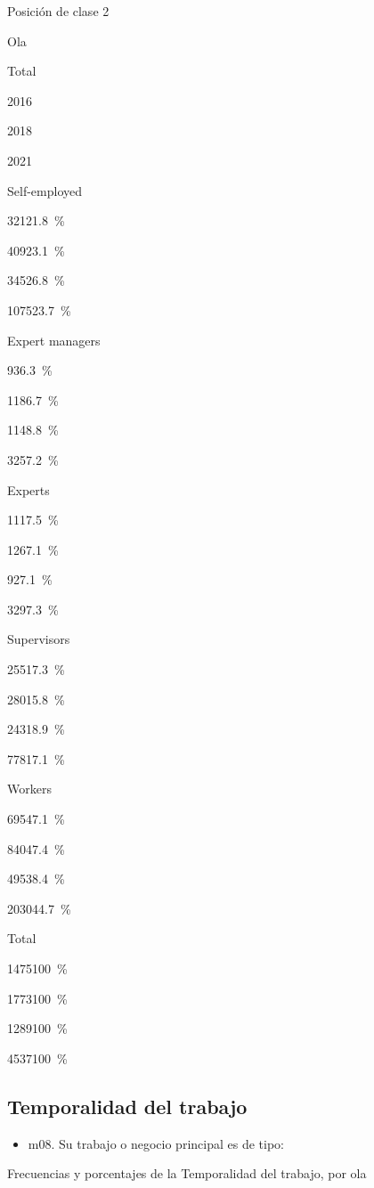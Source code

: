 \documentclass[
  12pt,
]{book}
\providecommand{\tightlist}{%
  \setlength{\itemsep}{0pt}\setlength{\parskip}{0pt}}
\begin{document}
Posición de clase 2

Ola

Total

2016

2018

2021

Self-employed

{321}{21.8~\%}

{409}{23.1~\%}

{345}{26.8~\%}

{1075}{23.7~\%}

Expert managers

{93}{6.3~\%}

{118}{6.7~\%}

{114}{8.8~\%}

{325}{7.2~\%}

Experts

{111}{7.5~\%}

{126}{7.1~\%}

{92}{7.1~\%}

{329}{7.3~\%}

Supervisors

{255}{17.3~\%}

{280}{15.8~\%}

{243}{18.9~\%}

{778}{17.1~\%}

Workers

{695}{47.1~\%}

{840}{47.4~\%}

{495}{38.4~\%}

{2030}{44.7~\%}

Total

{1475}{100~\%}

{1773}{100~\%}

{1289}{100~\%}

{4537}{100~\%}

\hypertarget{temporalidad-del-trabajo}{%
\subsection{Temporalidad del trabajo}\label{temporalidad-del-trabajo}}

\begin{itemize}
\tightlist
\item
  m08. Su trabajo o negocio principal es de tipo:
\end{itemize}

Frecuencias y porcentajes de la Temporalidad del trabajo, por ola
\end{document}
